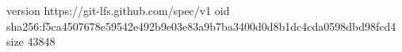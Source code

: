 version https://git-lfs.github.com/spec/v1
oid sha256:f5ca4507678e59542e492b9e03e83a9b7ba3400d0d8b1dc4cda0598dbd98fcd4
size 43848
